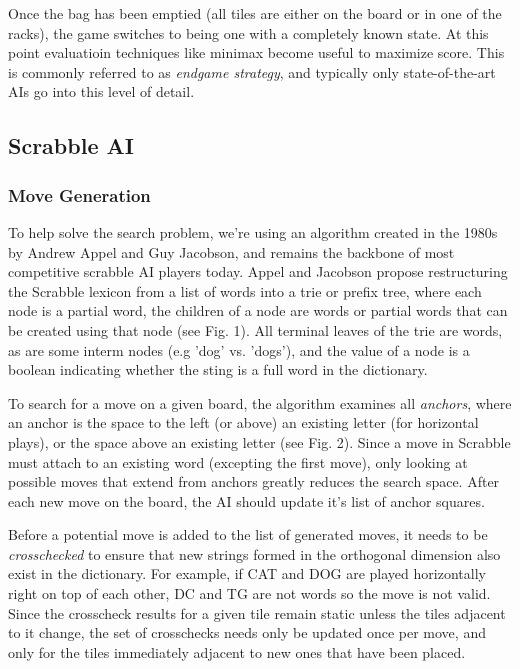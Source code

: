 \documentclass[12pt]{article}
\begin{document}
Once the bag has been emptied (all tiles are either on the board or in
one of the racks), the game switches to being one with a completely
known state. At this point evaluatioin techniques like minimax become
useful to maximize score. This is commonly referred to as
\emph{endgame strategy}, and typically only state-of-the-art AIs go
into this level of detail.

\subsection*{Scrabble AI}
\subsubsection*{Move Generation}
To help solve the search problem, we're using an algorithm created in
the 1980s by Andrew Appel and Guy Jacobson, and remains the backbone
of most competitive scrabble AI players today. Appel and Jacobson
propose restructuring the Scrabble lexicon from a list of words into a
trie or prefix tree, where each node is a partial word, the children
of a node are words or partial words that can be created using that
node (see Fig. 1). All terminal leaves of the trie are words, as are
some interm nodes (e.g 'dog' vs. 'dogs'), and the value of a node is a
boolean indicating whether the sting is a full word in the dictionary.
  
To search for a move on a given board, the algorithm examines all
\emph{anchors}, where an anchor is the space to the left (or above) an
existing letter (for horizontal plays), or the space above an existing
letter (see Fig. 2). Since a move in Scrabble must attach to an
existing word (excepting the first move), only looking at possible
moves that extend from anchors greatly reduces the search space. After
each new move on the board, the AI should update it's list of anchor
squares.

Before a potential move is added to the list of generated moves, it
needs to be \emph{crosschecked} to ensure that new strings formed in
the orthogonal dimension also exist in the dictionary. For example, if
CAT and DOG are played horizontally right on top of each other, DC and
TG are not words so the move is not valid.  Since the crosscheck
results for a given tile remain static unless the tiles adjacent to it
change, the set of crosschecks needs only be updated once per move,
and only for the tiles immediately adjacent to new ones that have been
placed.
\end{document}
